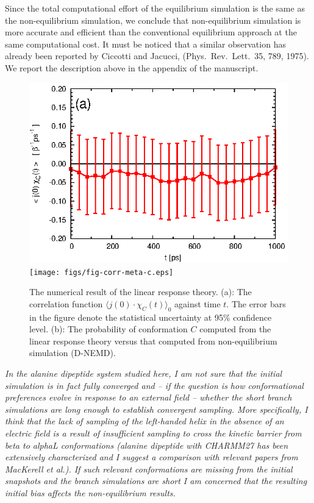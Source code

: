 \documentclass[]{revtex4-1}
\begin{document}
Since the total computational effort of
the equilibrium simulation is the same as the non-equilibrium
simulation, we conclude that non-equilibrium simulation is more
accurate and efficient than the conventional equilibrium approach  at the same computational cost.
It must be noticed that a similar
observation has already been reported by Ciccotti and Jacucci, (Phys.~Rev.~Lett.~35, 789, 1975). We report the description above in the appendix of the manuscript.
\\
\begin{figure}
  \centering
  \includegraphics{figs/fig-corr-meta.eps}
  \texttt{[image: figs/fig-corr-meta-c.eps]}
  \caption{
    The numerical result of the linear response theory.
    (a): The correlation function $\langle j(0)\cdot \chi_{C}(t)
    \rangle_0$ against time $t$.
    The error bars in the figure denote
    the statistical uncertainty at 95\% confidence level. 
    (b): The probability of conformation $C$ computed from the
    linear response theory versus that
    computed from non-equilibrium simulation (D-NEMD).}
  \label{fig:tmp1}
\end{figure}


\emph{
In the alanine dipeptide system studied here, I am not sure that the
initial simulation is in fact fully converged and -- if the question is
how conformational preferences evolve in response to an external field
-- whether the short branch simulations are long enough to establish
convergent sampling. More specifically, I think that the lack of
sampling of the left-handed helix in the absence of an electric field
is a result of insufficient sampling to cross the kinetic barrier from
beta to alphaL conformations (alanine dipeptide with CHARMM27 has been
extensively characterized and I suggest a comparison with relevant
papers from MacKerell et al.). If such relevant conformations are
missing from the initial snapshots and the branch simulations are
short I am concerned that the resulting initial bias affects the
non-equilibrium results.
}\\
\end{document}
